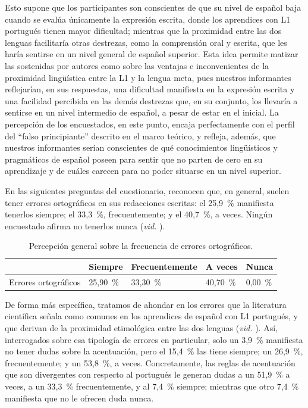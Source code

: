 \documentclass[spanish]{textolivre}
\begin{document}
Esto supone que los participantes son conscientes de que su nivel de español baja cuando se evalúa únicamente la expresión escrita, donde los aprendices con L1 portugués tienen mayor dificultad; mientras que la proximidad entre las dos lenguas facilitaría otras destrezas, como la comprensión oral y escrita, que les haría sentirse en un nivel general de español superior. Esta idea permite matizar las sostenidas por autores como \textcite{brown_principles_2000,capilla_o_2009,espinosa_creencias_2009,aires_influencia_2018} sobre las ventajas e inconvenientes de la proximidad lingüística entre la L1 y la lengua meta, pues nuestros informantes reflejarían, en sus respuestas, una dificultad manifiesta en la expresión escrita y una facilidad percibida en las demás destrezas que, en su conjunto, los llevaría a sentirse en un nivel intermedio de español, a pesar de estar en el inicial. La percepción de los encuestados, en este punto, encaja perfectamente con el perfil del “falso principiante” \cite{alvite_importancia_2004,Soares_2019,budhwar_role_2017,ribeiro_enfoque_2021} descrito en el marco teórico, y refleja, además, que nuestros informantes serían conscientes de qué conocimientos lingüísticos y pragmáticos de español poseen para sentir que no parten de cero en su aprendizaje y de cuáles carecen para no poder situarse en un nivel superior.

En las siguientes preguntas del cuestionario, reconocen que, en general, suelen tener errores ortográficos en sus redacciones escritas: el 25,9~\% manifiesta tenerlos siempre; el 33,3~\%, frecuentemente; y el 40,7~\%, a veces. Ningún encuestado afirma no tenerlos nunca (\textit{vid.} ).

\begin{table}[htbp]
\centering
\begin{threeparttable}
\caption{Percepción general sobre la frecuencia de errores ortográficos.}
\label{tb2}
\begin{tabular}{lllll}
\toprule
& Siempre & Frecuentemente & A veces & Nunca  \\ 
\midrule
Errores ortográficos & 25,90~\% & 33,30~\% & 40,70~\% & 0,00~\% \\
\bottomrule
\end{tabular}
\end{threeparttable}
\end{table}

De forma más específica, tratamos de ahondar en los errores que la literatura científica señala como comunes en los aprendices de español con L1 portugués, y que derivan de la proximidad etimológica entre las dos lenguas (\textit{vid.} ). Así, interrogados sobre esa tipología de errores en particular, solo un 3,9~\% manifiesta no tener dudas sobre la acentuación, pero el 15,4~\% las tiene siempre; un 26,9~\%, frecuentemente; y un 53,8~\%, a veces. Concretamente, las reglas de acentuación que son divergentes con respecto al portugués le generan dudas a un 51,9~\% a veces, a un 33,3~\% frecuentemente, y al 7,4~\% siempre; mientras que otro 7,4~\% manifiesta que no le ofrecen duda nunca.
\end{document}
